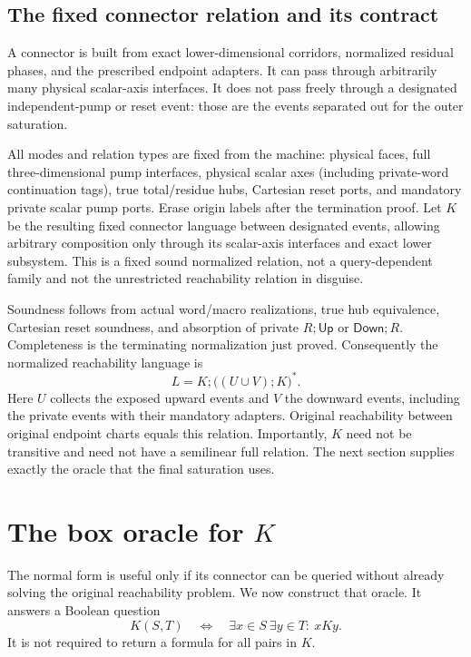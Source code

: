 \documentclass[11pt,a4paper]{article}
\theoremstyle{remark}
\newcommand{\Up}{\mathsf{Up}}
\newcommand{\Down}{\mathsf{Down}}
\begin{document}
\subsection{The fixed connector relation and its contract}

A connector is built from exact lower-dimensional corridors, normalized
residual phases, and the prescribed endpoint adapters. It can pass
through arbitrarily many physical scalar-axis interfaces. It does not
pass freely through a designated independent-pump or reset event:
those are the events separated out for the outer saturation.

All modes and relation types are fixed from the machine: physical faces, full three-dimensional pump interfaces, physical scalar axes (including private-word continuation tags), true total/residue hubs, Cartesian reset ports, and mandatory private scalar pump ports. Erase origin labels after the termination proof. Let \(K\) be the resulting fixed connector language between designated events, allowing arbitrary composition only through its scalar-axis interfaces and exact lower subsystem. This is a fixed sound normalized relation, not a query-dependent family and not the unrestricted reachability relation in disguise.

Soundness follows from actual word/macro realizations, true hub equivalence, Cartesian reset soundness, and absorption of private \(R;\Up\) or \(\Down;R\). Completeness is the terminating normalization just proved. Consequently the normalized reachability language is
\begin{equation}
 L=K;\bigl((U\cup V);K\bigr)^*.\label{eq:language}
\end{equation}
Here \(U\) collects the exposed upward events and \(V\) the downward
events, including the private events with their mandatory adapters.
Original reachability between original endpoint charts equals this
relation. Importantly, \(K\) need not be transitive and need not have a
semilinear full relation. The next section supplies exactly the oracle
that the final saturation uses.

\section[The box oracle for K]{The box oracle for \(K\)}\label{sec:oracle}

The normal form is useful only if its connector can be queried without
already solving the original reachability problem. We now construct
that oracle. It answers a Boolean question
\[
 K(S,T)\quad\Longleftrightarrow\quad
       \exists x\in S\ \exists y\in T:\ xKy.
\]
It is not required to return a formula for all pairs in \(K\).
\end{document}
